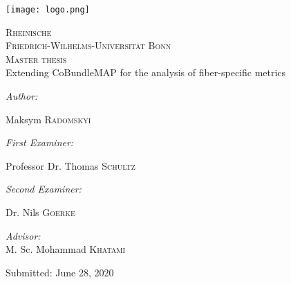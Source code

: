 \begin{titlepage}
	\centering
     
    \texttt{[image: logo.png]}\par
    \vspace{0.7cm}
	\textsc{\LARGE Rheinische\\[5mm] Friedrich-Wilhelms-Universität Bonn}\\[2cm]
	
	\textsc{\Large Master thesis}\\[1cm]
	
	
    { \Large Extending CoBundleMAP for the analysis of fiber-specific metrics }\\[1.4cm]
	
	\vspace{1cm}
		
	\noindent
    \begin{minipage}[t]{0.4\textwidth}
        \begin{flushleft} \large
            \emph{Author:}\par
           Maksym \textsc{Radomskyi}
        \end{flushleft}        
    \end{minipage}    
    \begin{minipage}[t]{0.5\textwidth}
        \begin{flushright} \large
            \emph{First Examiner:}\par
            Professor Dr. Thomas \textsc{Schultz}\par\vspace{0.5cm}
            
            \emph{Second Examiner:}\par
            Dr. Nils \textsc{Goerke}\par\vspace{0.5cm}

            \emph{Advisor:} \\
            M. Sc. Mohammad \textsc{Khatami}\par\vspace{0.5cm}
        \end{flushright}
    \end{minipage}

    \vfill

    {\large Submitted:\hspace{1cm} June 28, 2020}
\end{titlepage}
